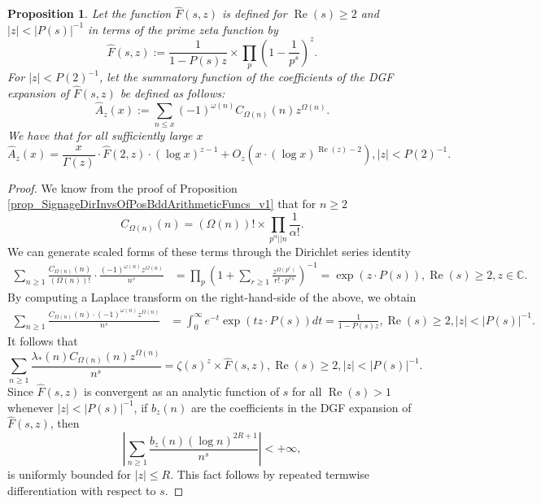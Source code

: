 \documentclass[11pt,reqno,a4letter]{article}
\numberwithin{figure}{section}
\numberwithin{table}{section}
\theoremstyle{plain}
\newtheorem{prop}[theorem]{Proposition}
\numberwithin{theorem}{section}
\theoremstyle{definition}
\renewcommand{\Re}{\operatorname{Re}}
\begin{document}
\begin{prop} 
\label{prop_HatAzx_ModSummatoryFuncExps_RelatedToCkn} 
Let the function $\widehat{F}(s, z)$ is defined for $\Re(s) \geq 2$ and $|z| < |P(s)|^{-1}$ 
in terms of the prime zeta function by 
\[
\widehat{F}(s, z) := \frac{1}{1-P(s) z} 
     \times \prod_p \left(1 - \frac{1}{p^s}\right)^{z}. 
\]
For $|z| < P(2)^{-1}$, let the summatory function of the coefficients of the 
DGF expansion of $\widehat{F}(s, z)$ be defined as follows: 
\[
\widehat{A}_z(x) := \sum_{n \leq x} (-1)^{\omega(n)} 
     C_{\Omega(n)}(n) z^{\Omega(n)}. 
\]
We have that for all sufficiently large $x$ 
\[
\widehat{A}_z(x) = \frac{x}{\Gamma(z)} \cdot \widehat{F}(2, z) \cdot (\log x)^{z-1} + 
     O_{z}\left(x \cdot (\log x)^{\Re(z) - 2}\right), |z| < P(2)^{-1}. 
\]
\end{prop} 
\begin{proof} 
We know from the proof of 
Proposition \ref{prop_SignageDirInvsOfPosBddArithmeticFuncs_v1} that for $n \geq 2$ 
\[
C_{\Omega(n)}(n) = (\Omega(n))! \times \prod_{p^{\alpha}||n} \frac{1}{\alpha!}. 
\]
We can generate scaled forms of these terms through the Dirichlet series identity 
\begin{align*} 
\sum_{n \geq 1} \frac{C_{\Omega(n)}(n)}{(\Omega(n))!} \cdot 
     \frac{(-1)^{\omega(n)} z^{\Omega(n)}}{n^s} & = \prod_p \left(1 + \sum_{r \geq 1} 
     \frac{z^{\Omega(p^r)}}{r! \cdot p^{rs}}\right)^{-1} 
     = \exp\left(z \cdot P(s)\right), \Re(s) \geq 2, z \in \mathbb{C}. 
\end{align*} 
By computing a Laplace transform on the right-hand-side of the above, we obtain 
\begin{align*} 
\sum_{n \geq 1} \frac{C_{\Omega(n)}(n) \cdot (-1)^{\omega(n)} z^{\Omega(n)}}{n^s} & = 
     \int_0^{\infty} e^{-t} \exp\left(tz \cdot P(s)\right) dt = \frac{1}{1 - P(s) z}, 
     \Re(s) \geq 2, |z| < |P(s)|^{-1}. 
\end{align*} 
It follows that 
\[
\sum_{n \geq 1} \frac{\lambda_{\ast}(n) C_{\Omega(n)}(n) z^{\Omega(n)}}{n^s} = 
     \zeta(s)^z \times \widehat{F}(s, z), \Re(s) \geq 2, |z| < |P(s)|^{-1}. 
\]
Since $\widehat{F}(s, z)$ is convergent as an analytic function of $s$ for all $\Re(s) > 1$ 
whenever $|z| < |P(s)|^{-1}$, 
if $b_z(n)$ are the coefficients in the DGF expansion of $\widehat{F}(s, z)$, then 
\[
\left\lvert \sum_{n \geq 1} \frac{b_z(n) (\log n)^{2R+1}}{n^s} \right\rvert < +\infty, 
\]
is uniformly bounded for $|z| \leq R$. This fact follows by repeated termwise differentiation 
with respect to $s$. 


\end{proof}
\end{document}

